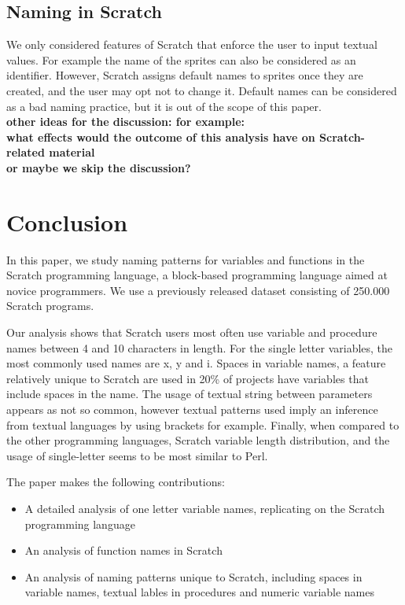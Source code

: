 \documentclass[conference]{IEEEtran}
\newcommand{\todo}[1]{ \textbf{#1} }
\begin{document}
\subsection{Naming in Scratch}
We only considered features of Scratch that enforce the user to input textual values. For example the name of the sprites can also be considered as an identifier. However, Scratch assigns default names to sprites once they are created, and the user may opt not to change it. Default names can be considered as a bad naming practice, but it is out of the scope of this paper.\\
\todo{other ideas for the discussion: for example: \\
what effects would the outcome of this analysis have on Scratch-related material\\
or maybe we skip the discussion?
}

\section{Conclusion}
In this paper, we study naming patterns for variables and functions in the Scratch programming language, a block-based programming language aimed at novice programmers. We use a previously released dataset consisting of 250.000 Scratch programs. 

Our analysis shows that Scratch users most often use variable and procedure names between 4 and 10 characters in length. For the single letter variables, the most commonly used names are x, y and i. Spaces in variable names, a feature relatively unique to Scratch are used in 20\% of projects have variables that include spaces in the name. The usage of textual string between parameters appears as not so common, however textual patterns used imply an inference from textual languages by using brackets for example. Finally, when compared to the other programming languages, Scratch variable length distribution, and the usage of single-letter seems to be most similar to Perl.

The paper makes the following contributions:

\begin{itemize}
\item A detailed analysis of one letter variable names, replicating \cite{Beniamini} on the Scratch programming language
\item An analysis of function names in Scratch
\item An analysis of naming patterns unique to Scratch, including spaces in variable names, textual lables in procedures and numeric variable names
\end{itemize}
\end{document}
